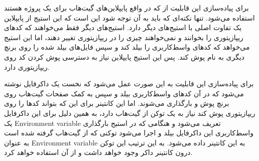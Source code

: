 برای پیاده‌سازی این قابلیت از
که در واقع پایپلاین‌های گیت‌هاب برای یک پروژه هستند استفاده می‌شود.
تنها نکته‌ای که باید به آن توجه شود این است که این استیج از پایپلاین یک تفاوت اصلی با استیج‌های دیگر دارد.
استیج‌های دیگر فقط می‌خواهند که کدهای ریپازیتوری را بخوانند و نمی‌خواهند چیزی را در ریپازیتوری تغییر دهند،
اما این استیج می‌خواهد که کد‌های واسط‌کاربری را بیلد کند و سپس فایل‌های بیلد شده را روی برنچ دیگری به نام
پوش کند. پس این استیج پایپلاین نیاز به دسترسی پوش کردن کد روی ریپازیتوری دارد.

برای پیاده‌سازی این قابلیت به این صورت عمل می‌شود که نخست یک داکرفایل نوشته می‌شود
که در آن کدهای واسط‌کاربری بیلد و سپس به کمک صفحات گیت‌هاب روی برنچ
پوش و بارگذاری می‌شوند.
اما این کانتینر برای این که بتواند کدها را روی ریپازیتوری پوش کند نیاز به یک توکن از گیت‌هاب دارد،
به همین دلیل برای این داکرفایل یک
\gls{Environment variable}
تعریف می‌شود و هنگامی که در استیج بارگذاری واسط‌کاربری این داکرفایل بیلد
و اجرا می‌شود توکنی که از گیت‌هاب گرفته شده است به عنوان
\gls{Environment variable}
به این کانتینر داده می‌شود. به این ترتیب این توکن درون کانتینر داکر وجود خواهد داشت و
از آن استفاده خواهد کرد.

